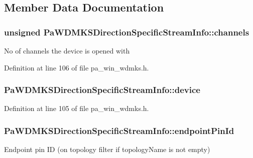 \subsection{Member Data Documentation}
\subsubsection[{\texorpdfstring{channels}{channels}}]{\setlength{\rightskip}{0pt plus 5cm}unsigned Pa\+W\+D\+M\+K\+S\+Direction\+Specific\+Stream\+Info\+::channels}\hypertarget{struct_pa_w_d_m_k_s_direction_specific_stream_info_a5bea6996e1aa45e8525769b13eca32a0}{}\label{struct_pa_w_d_m_k_s_direction_specific_stream_info_a5bea6996e1aa45e8525769b13eca32a0}
No of channels the device is opened with 

Definition at line 106 of file pa\+\_\+win\+\_\+wdmks.\+h.

\subsubsection[{\texorpdfstring{device}{device}}]{ Pa\+W\+D\+M\+K\+S\+Direction\+Specific\+Stream\+Info\+::device}\hypertarget{struct_pa_w_d_m_k_s_direction_specific_stream_info_a37ff146054a9ae1c16b87f589874949a}{}\label{struct_pa_w_d_m_k_s_direction_specific_stream_info_a37ff146054a9ae1c16b87f589874949a}


Definition at line 105 of file pa\+\_\+win\+\_\+wdmks.\+h.

\subsubsection[{\texorpdfstring{endpoint\+Pin\+Id}{endpointPinId}}]{ Pa\+W\+D\+M\+K\+S\+Direction\+Specific\+Stream\+Info\+::endpoint\+Pin\+Id}\hypertarget{struct_pa_w_d_m_k_s_direction_specific_stream_info_a92bdda98baa8976a19d99da20eb6d21a}{}\label{struct_pa_w_d_m_k_s_direction_specific_stream_info_a92bdda98baa8976a19d99da20eb6d21a}
Endpoint pin ID (on topology filter if topology\+Name is not empty) 

